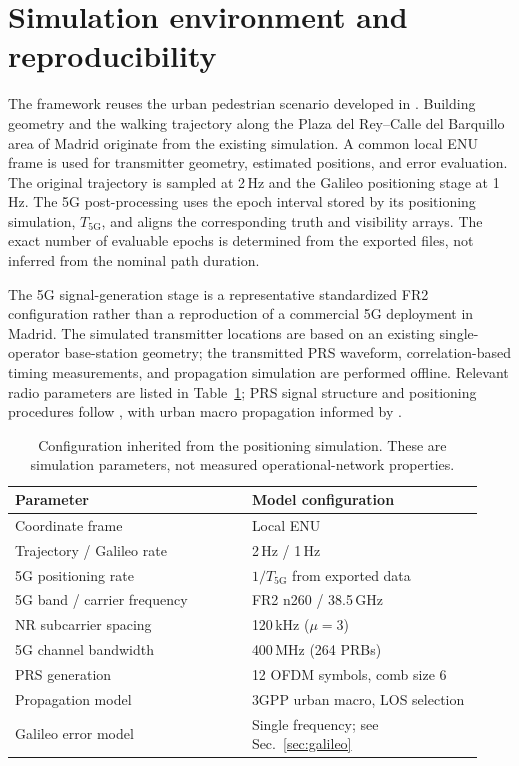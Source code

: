 \documentclass[pdflatex,sn-mathphys-num]{sn-jnl}
\begin{document}
\section{Simulation environment and reproducibility}\label{sec:scenario}

The framework reuses the urban pedestrian scenario developed in
\cite{SanchezHerederoThesis}. Building geometry and the walking trajectory
along the Plaza del Rey--Calle del Barquillo area of Madrid originate from
the existing simulation. A common local ENU frame is used for transmitter
geometry, estimated positions, and error evaluation. The original trajectory
is sampled at 2\,Hz and the Galileo positioning stage at 1\,Hz. The 5G
post-processing uses the epoch interval stored by its positioning simulation,
$T_{\mathrm{5G}}$, and aligns the corresponding truth and visibility arrays.
The exact number of evaluable epochs is determined from the exported files,
not inferred from the nominal path duration.

The 5G signal-generation stage is a representative standardized FR2
configuration rather than a reproduction of a commercial 5G deployment in
Madrid. The simulated transmitter locations are based on an existing
single-operator base-station geometry; the transmitted PRS waveform,
correlation-based timing measurements, and propagation simulation are
performed offline. Relevant radio parameters are listed in
Table~\ref{tab:scenario}; PRS signal structure and positioning procedures
follow \cite{ETSI38211,ETSI38305}, with urban macro propagation informed by
\cite{ETSI38901}.

\begin{table}[t]
\caption{Configuration inherited from the positioning simulation. These
are simulation parameters, not measured operational-network properties.}
\label{tab:scenario}
\begin{tabular}{@{}p{0.47\linewidth}p{0.46\linewidth}@{}}
\toprule
Parameter & Model configuration\\
\midrule
Coordinate frame & Local ENU\\
Trajectory / Galileo rate & 2\,Hz / 1\,Hz\\
5G positioning rate & $1/T_{\mathrm{5G}}$ from exported data\\
5G band / carrier frequency & FR2 n260 / 38.5\,GHz\\
NR subcarrier spacing & 120\,kHz ($\mu=3$)\\
5G channel bandwidth & 400\,MHz (264 PRBs)\\
PRS generation & 12 OFDM symbols, comb size 6\\
Propagation model & 3GPP urban macro, LOS selection\\
Galileo error model & Single frequency; see Sec.~\ref{sec:galileo}\\
\bottomrule
\end{tabular}
\end{table}
\end{document}
